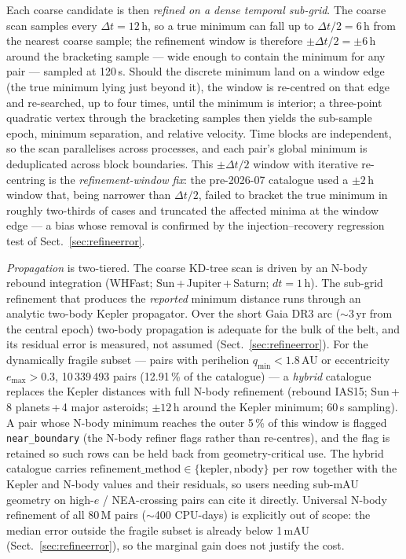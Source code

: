 \documentclass{aa}
\begin{document}
Each coarse candidate is then \emph{refined on a dense temporal sub-grid}. The
coarse scan samples every $\Delta t = 12$\,h, so a true minimum can fall up to
$\Delta t/2 = 6$\,h from the nearest coarse sample; the refinement window is
therefore $\pm\Delta t/2 = \pm6$\,h around the bracketing sample --- wide enough
to contain the minimum for any pair --- sampled at 120\,s. Should the discrete
minimum land on a window edge (the true minimum lying just beyond it), the window
is re-centred on that edge and re-searched, up to four times, until the minimum
is interior; a three-point quadratic vertex through the bracketing samples then
yields the sub-sample epoch, minimum separation, and relative velocity. Time
blocks are independent, so the scan parallelises across processes, and each
pair's global minimum is deduplicated across block boundaries. This
$\pm\Delta t/2$ window with iterative re-centring is the \emph{refinement-window
fix}: the pre-2026-07 catalogue used a $\pm2$\,h window that, being narrower than
$\Delta t/2$, failed to bracket the true minimum in roughly two-thirds of cases
and truncated the affected minima at the window edge --- a bias whose removal is
confirmed by the injection--recovery regression test of
Sect.~\ref{sec:refineerror}.

\emph{Propagation} is two-tiered. The coarse KD-tree scan is driven by an
N-body rebound integration (WHFast; Sun\,+\,Jupiter\,+\,Saturn; $dt = 1$\,h).
The sub-grid refinement that produces the \emph{reported} minimum distance runs
through an analytic two-body Kepler propagator. Over the short Gaia DR3 arc
($\sim$3\,yr from the central epoch) two-body propagation is adequate for the
bulk of the belt, and its residual error is measured, not assumed
(Sect.~\ref{sec:refineerror}). For the dynamically fragile subset --- pairs
with perihelion $q_{\min}<1.8$\,AU or eccentricity $e_{\max}>0.3$, 10\,339\,493
pairs (12.91\,\% of the catalogue) --- a \emph{hybrid} catalogue replaces the
Kepler distances with full N-body refinement (rebound IAS15; Sun\,+\,8
planets\,+\,4 major asteroids; $\pm12$\,h around the Kepler minimum; 60\,s
sampling). A pair whose N-body minimum reaches the outer 5\,\% of this window is
flagged \texttt{near\_boundary} (the N-body refiner flags rather than re-centres),
and the flag is retained so such rows can be held back from geometry-critical
use. The hybrid catalogue carries
$\mathrm{refinement\_method}\in\{\mathrm{kepler},\mathrm{nbody}\}$ per row
together with the Kepler and N-body values and their residuals, so users needing
sub-mAU geometry on high-$e$ / NEA-crossing pairs can cite it directly.
Universal N-body refinement of all 80\,M pairs ($\sim$400 CPU-days) is
explicitly out of scope: the median error outside the fragile subset is already
below 1\,mAU (Sect.~\ref{sec:refineerror}), so the marginal gain does not
justify the cost.
\end{document}
